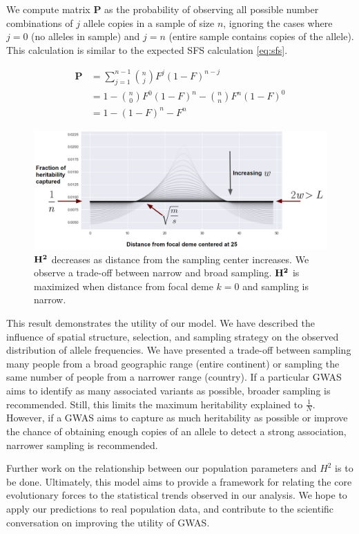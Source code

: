 We compute matrix $\textbf{P}$ as the probability of observing all possible number combinations of $j$ allele copies in a sample of size $n$, ignoring the cases where $j = 0$ (no alleles in sample) and $j = n$ (entire sample contains copies of the allele). This calculation is similar to the expected SFS calculation \ref{eq:sfs}. 

\begin{equation}\label{eq:psamp}
    \begin{split}
    \textbf{P} &= \sum_{j=1}^{n-1} {n \choose j} F^j (1-F)^{n-j} \\
    &= 1 - {n \choose 0}F^0(1-F)^n - {n \choose n}F^n (1-F)^0 \\
    &= 1- (1-F)^n - F^n
    \end{split}
\end{equation}


\begin{figure}[H]
    \centering
    \hspace*{-1.5cm}
    \includegraphics[scale=0.4]{img/heritability.JPG}
    \caption{$\bf{H^2}$ decreases as distance from the sampling center increases. We observe a trade-off between narrow and broad sampling. $\bf{H^2}$ is maximized when distance from focal deme $k =0$ and sampling is narrow.}
    \label{fig:missing_h}
\end{figure}

This result demonstrates the utility of our model. We have described the influence of spatial structure, selection, and sampling strategy on the observed distribution of allele frequencies. We have presented a trade-off between sampling many people from a broad geographic range (entire continent) or sampling the same number of people from a narrower range (country). If a particular GWAS aims to identify as many associated variants as possible, broader sampling is recommended. Still, this limits the maximum heritability explained to $\frac{1}{N}$. However, if a GWAS aims to capture as much heritability as possible or improve the chance of obtaining enough copies of an allele to detect a strong association, narrower sampling is recommended.


Further work on the relationship between our population parameters and $H^2$ is to be done. Ultimately, this model aims to provide a framework for relating the core evolutionary forces to the statistical trends observed in our analysis. We hope to apply our predictions to real population data, and contribute to the scientific conversation on improving the utility of GWAS.


